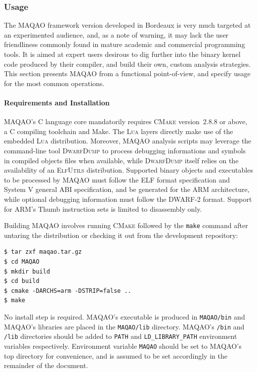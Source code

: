 \documentclass[11pt, a4paper, twoside]{montblanc2}
\def\cmake{\textsc{CMake}\xspace}
\def\lua{\textsc{Lua}\xspace}
\def\dd{\textsc{DwarfDump}\xspace}
\def\elfutils{\textsc{ElfUtils}\xspace}
\begin{document}
\subsubsection{Usage}

The MAQAO framework version developed in Bordeaux is very much targeted at an experimented audience, 
and, as a note of warning, it may lack the user friendliness commonly found in mature academic and 
commercial programming tools. It is aimed at expert users desirous to dig further into the binary 
kernel code produced by their compiler, and build their own, custom analysis strategies.
This section presents MAQAO from a functional point-of-view, and specify usage for the most common
operations.

\paragraph{Requirements and Installation}

MAQAO's C language core mandatorily requires \cmake version~2.8.8 or above, a C compiling toolchain 
and Make. The \lua layers directly make use of the embedded \lua distribution. Moreover, MAQAO 
analysis scripts may leverage the command-line tool \dd to process debugging informations and 
symbols in compiled objects files when available, while \dd itself relies on the availability of an 
\elfutils distribution. Supported binary objects and executables to be processed by MAQAO must 
follow the ELF format specification and System V general ABI specification, and be generated for the 
ARM architecture, while optional debugging information must follow the DWARF-2 format. Support for 
ARM's Thumb instruction sets is limited to disassembly only.

Building MAQAO involves running \cmake followed by the \verb|make| command after untaring the 
distribution or checking it out from the development repository:

\begin{verbatim}
$ tar zxf maqao.tar.gz
$ cd MAQAO
$ mkdir build
$ cd build
$ cmake -DARCHS=arm -DSTRIP=false ..
$ make
\end{verbatim}

No install step is required. MAQAO's executable is produced in \verb|MAQAO/bin| and MAQAO's 
libraries are placed in the \verb|MAQAO/lib| directory. MAQAO's \verb|/bin| and \verb|/lib|
directories should be added to \verb|PATH| and \verb|LD_LIBRARY_PATH| environment variables 
respectively. Environment variable \verb|MAQAO| should be set to MAQAO's top directory for 
convenience, and is assumed to be set accordingly in the remainder of the document.
\end{document}
